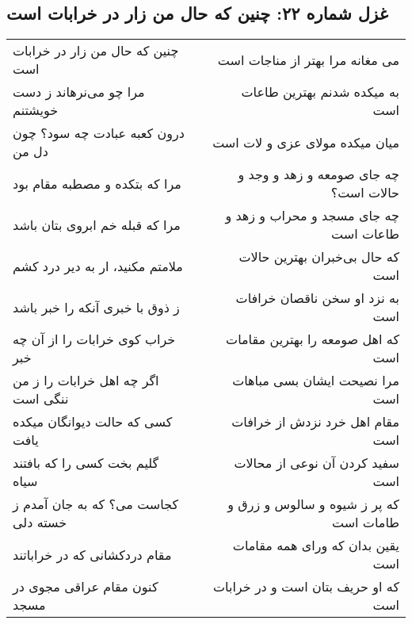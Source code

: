 \begin{center}
\section*{غزل شماره ۲۲: چنین که حال من زار در خرابات است}
\label{sec:022}
\begin{longtable}{l p{0.5cm} r}
چنین که حال من زار در خرابات است
&&
می مغانه مرا بهتر از مناجات است
\\
مرا چو می‌نرهاند ز دست خویشتنم
&&
به میکده شدنم بهترین طاعات است
\\
درون کعبه عبادت چه سود؟ چون دل من
&&
میان میکده مولای عزی و لات است
\\
مرا که بتکده و مصطبه مقام بود
&&
چه جای صومعه و زهد و وجد و حالات است؟
\\
مرا که قبله خم ابروی بتان باشد
&&
چه جای مسجد و محراب و زهد و طاعات است
\\
ملامتم مکنید، ار به دیر درد کشم
&&
که حال بی‌خبران بهترین حالات است
\\
ز ذوق با خبری آنکه را خبر باشد
&&
به نزد او سخن ناقصان خرافات است
\\
خراب کوی خرابات را از آن چه خبر
&&
که اهل صومعه را بهترین مقامات است
\\
اگر چه اهل خرابات را ز من ننگی است
&&
مرا نصیحت ایشان بسی مباهات است
\\
کسی که حالت دیوانگان میکده یافت
&&
مقام اهل خرد نزدش از خرافات است
\\
گلیم بخت کسی را که بافتند سیاه
&&
سفید کردن آن نوعی از محالات است
\\
کجاست می؟ که به جان آمدم ز خسته دلی
&&
که پر ز شیوه و سالوس و زرق و طامات است
\\
مقام دردکشانی که در خراباتند
&&
یقین بدان که ورای همه مقامات است
\\
کنون مقام عراقی مجوی در مسجد
&&
که او حریف بتان است و در خرابات است
\\
\end{longtable}
\end{center}
